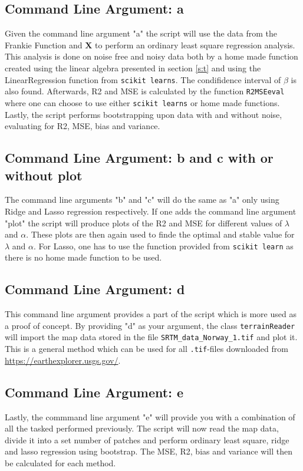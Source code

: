 \documentclass[12pt]{article}
\begin{document}
\subsection{Command Line Argument: a}
Given the command line argument "a" the script will use the data from the Frankie Function and $\bm{X}$ to perform an ordinary least square regression analysis. This analysis is done on noise free and noisy data both by a home made function created using the linear algebra presented in section \ref{s:t} and using the LinearRegression function from \texttt{scikit learns}. The condifidence interval of $\beta$ is also found. Afterwards, R2 and MSE is calculated by the function \texttt{R2MSEeval} where one can choose to use either \texttt{scikit learns} or home made functions. Lastly, the script performs bootstrapping upon data with and without noise, evaluating for R2, MSE, bias and variance.
\subsection{Command Line Argument: b and c with or without plot}
The command line arguments "b" and "c" will do the same as "a" only using Ridge and Lasso regression respectively. If one adds the command line argument "plot" the script will produce plots of the R2 and MSE for different values of $\lambda$ and $\alpha$. These plots are then again used to finde the optimal and stable value for $\lambda$ and $\alpha$. For Lasso, one has to use the function provided from \texttt{scikit learn} as there is no home made function to be used.
\subsection{Command Line Argument: d}
This command line argument provides a part of the script which is more used as a proof of concept. By providing "d" as your argument, the class \texttt{terrainReader} will import the map data stored in the file \texttt{SRTM\_data\_Norway\_1.tif} and plot it. This is a general method which can be used for all \texttt{.tif}-files downloaded from \url{https://earthexplorer.usgs.gov/}.
\subsection{Command Line Argument: e}
Lastly, the commmand line argument "e" will provide you with a combination of all the tasked performed previously. The script will now read the map data, divide it into a set number of patches and perform ordinary least square, ridge and lasso regression using bootstrap. The MSE, R2, bias and variance will then be calculated for each method.
\end{document}
